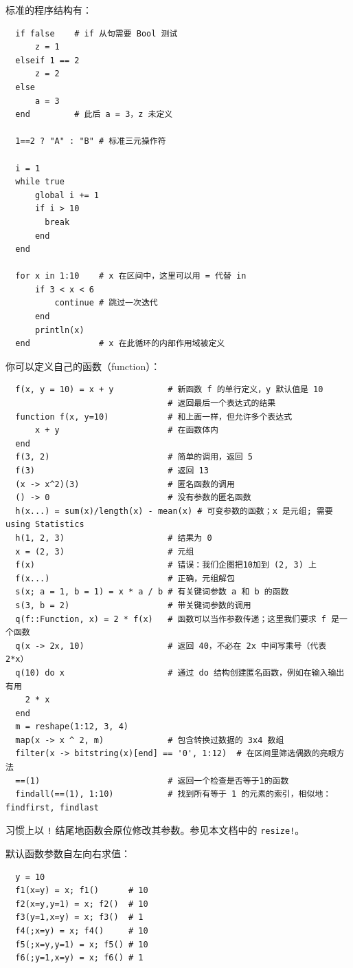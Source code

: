 \documentclass[10pt,a4paper]{article}
\begin{document}
标准的程序结构有：
\begin{lstlisting}
  if false    # if 从句需要 Bool 测试
      z = 1
  elseif 1 == 2
      z = 2
  else
      a = 3
  end         # 此后 a = 3，z 未定义

  1==2 ? "A" : "B" # 标准三元操作符

  i = 1
  while true
      global i += 1
      if i > 10
        break
      end
  end

  for x in 1:10    # x 在区间中，这里可以用 = 代替 in
      if 3 < x < 6
          continue # 跳过一次迭代
      end
      println(x)
  end              # x 在此循环的内部作用域被定义
\end{lstlisting}

你可以定义自己的函数（function）：
\begin{lstlisting}
  f(x, y = 10) = x + y           # 新函数 f 的单行定义，y 默认值是 10
                                 # 返回最后一个表达式的结果
  function f(x, y=10)            # 和上面一样，但允许多个表达式
      x + y                      # 在函数体内
  end
  f(3, 2)                        # 简单的调用，返回 5
  f(3)                           # 返回 13
  (x -> x^2)(3)                  # 匿名函数的调用
  () -> 0                        # 没有参数的匿名函数
  h(x...) = sum(x)/length(x) - mean(x) # 可变参数的函数；x 是元组; 需要 using Statistics
  h(1, 2, 3)                     # 结果为 0
  x = (2, 3)                     # 元组
  f(x)                           # 错误：我们企图把10加到 (2, 3) 上
  f(x...)                        # 正确，元组解包
  s(x; a = 1, b = 1) = x * a / b # 有关键词参数 a 和 b 的函数
  s(3, b = 2)                    # 带关键词参数的调用
  q(f::Function, x) = 2 * f(x)   # 函数可以当作参数传递；这里我们要求 f 是一个函数
  q(x -> 2x, 10)                 # 返回 40，不必在 2x 中间写乘号（代表 2*x）
  q(10) do x                     # 通过 do 结构创建匿名函数，例如在输入输出有用
    2 * x
  end
  m = reshape(1:12, 3, 4)
  map(x -> x ^ 2, m)             # 包含转换过数据的 3x4 数组
  filter(x -> bitstring(x)[end] == '0', 1:12)  # 在区间里筛选偶数的亮眼方法
  ==(1)                          # 返回一个检查是否等于1的函数
  findall(==(1), 1:10)           # 找到所有等于 1 的元素的索引，相似地：findfirst, findlast
\end{lstlisting}

习惯上以 \lstinline|!| 结尾地函数会原位修改其参数。参见本文档中的 \lstinline|resize!|。

默认函数参数自左向右求值：
\begin{lstlisting}
  y = 10
  f1(x=y) = x; f1()      # 10
  f2(x=y,y=1) = x; f2()  # 10
  f3(y=1,x=y) = x; f3()  # 1
  f4(;x=y) = x; f4()     # 10
  f5(;x=y,y=1) = x; f5() # 10
  f6(;y=1,x=y) = x; f6() # 1
\end{lstlisting}
\end{document}
